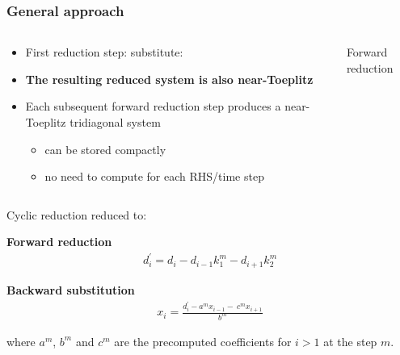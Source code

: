\begin{frame}
\frametitle{General approach}
\begin{columns}
\begin{column}{0.5\textwidth}
\begin{itemize}
\item {First reduction step: substitute:
    }
\item \textbf{The resulting reduced system is also near-Toeplitz}
\item Each subsequent forward reduction step produces a near-Toeplitz
    tridiagonal system
\begin{itemize}
    \item can be stored compactly
    \item no need to compute for each RHS/time step
\end{itemize}
\end{itemize}
\end{column}
\begin{column}{0.5\textwidth}
\centering
Forward reduction
\end{column}
\end{columns}
\end{frame}

\begin{frame}
Cyclic reduction reduced to:

\vspace{1cm}

\textbf{Forward reduction}
\begin{align*}
d^{\prime}_i = d_i - d_{i-1}k_1^{m}  - d_{i+1}k_2^{m}
\end{align*}

\textbf{Backward substitution}
\begin{align*}
x_i = \frac{d^{\prime}_i - a^mx_{i-1} - \
    c^{m}x_{i+1}}{b^m}
\end{align*}

where $a^m$, $b^m$ and $c^m$ are the precomputed
coefficients for $i>1$ at the step $m$.
\end{frame}
